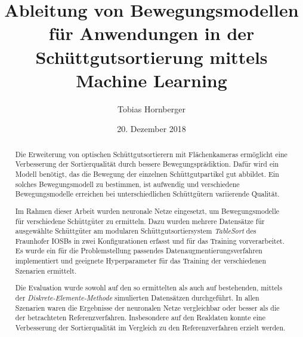 \documentclass[german]{isasthesis}
\title{Ableitung von Bewegungsmodellen für Anwendungen in der Schüttgutsortierung mittels Machine Learning}
\author{Tobias Hornberger}
\date{20. Dezember 2018}
\begin{document}
    \maketitle

    \begin{abstract}
    Die Erweiterung von optischen Schüttgutsortierern mit Flächenkameras ermöglicht eine Verbesserung der Sortierqualität durch bessere Bewegungsprädiktion.
    Dafür wird ein Modell benötigt, das die Bewegung der einzelnen Schüttgutpartikel gut abbildet.
    Ein solches Bewegungsmodell zu bestimmen, ist aufwendig und verschiedene Bewegungsmodelle erreichen bei unterschiedlichen Schüttgütern variierende Qualität.

    Im Rahmen dieser Arbeit wurden neuronale Netze eingesetzt, um Bewegungsmodelle für verschiedene Schüttgüter zu ermitteln.
    Dazu wurden mehrere Datensätze für ausgewählte Schüttgüter 
    am modularen Schüttgutsortiersystem \textit{TableSort} des Fraunhofer IOSBs in zwei Konfigurationen erfasst und für das Training vorverarbeitet.
    Es wurde ein für die Problemstellung passendes Datenaugmentierungsverfahren implementiert und geeignete Hyperparameter für das Training der verschiedenen Szenarien ermittelt.

    Die Evaluation wurde sowohl auf den so ermittelten als auch auf bestehenden, mittels der \textit{Diskrete-Elemente-Methode} simulierten Datensätzen durchgeführt.
    In allen Szenarien waren die Ergebnisse der neuronalen Netze vergleichbar oder besser als die der betrachteten Referenzverfahren.
    Insbesondere auf den Realdaten konnte eine Verbesserung der Sortierqualität im Vergleich zu den Referenzverfahren erzielt werden. 
    \end{abstract}

    \renewcommand{\abstractname}{Abstract}
\end{document}
